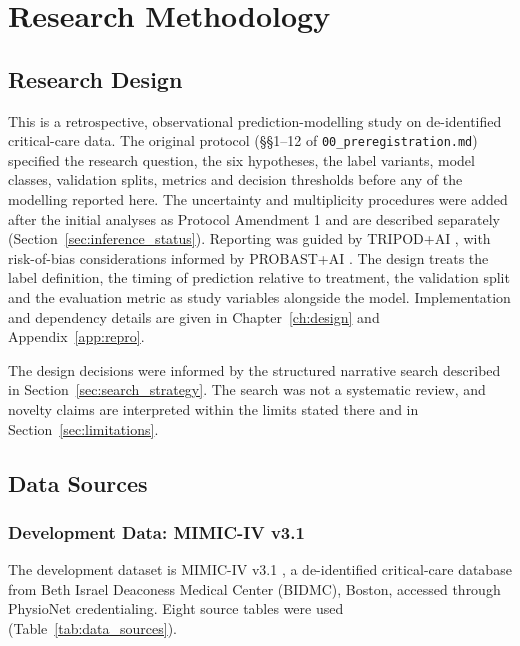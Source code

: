 \chapter{Research Methodology}
\label{ch:methodology}


\section{Research Design}

This is a retrospective, observational prediction-modelling study on
de-identified critical-care data. The original protocol (\S\S1--12 of
\texttt{00\_preregistration.md}) specified the research question, the six
hypotheses, the label variants, model classes, validation splits, metrics and
decision thresholds before any of the modelling reported here. The uncertainty
and multiplicity procedures were added after the initial analyses as Protocol
Amendment 1 and are described separately (Section~\ref{sec:inference_status}).
Reporting was guided by TRIPOD+AI \cite{collins2024tripodai}, with
risk-of-bias considerations informed by PROBAST+AI \cite{moons2025probastai}.
The design treats the label definition, the timing
of prediction relative to treatment, the validation split and the evaluation
metric as study variables alongside the model. Implementation and dependency
details are given in Chapter~\ref{ch:design} and Appendix~\ref{app:repro}.

The design decisions were informed by the structured narrative search
described in Section~\ref{sec:search_strategy}. The search was not a
systematic review, and novelty claims are interpreted within the limits stated
there and in Section~\ref{sec:limitations}.


\section{Data Sources}
\label{sec:data}

\subsection{Development Data: MIMIC-IV v3.1}

The development dataset is MIMIC-IV v3.1
\cite{johnson2023mimiciv,johnson2023mimiciv_scidata,pollard2026physionet}, a
de-identified critical-care database from Beth Israel Deaconess Medical Center
(BIDMC), Boston, accessed through PhysioNet credentialing. Eight source tables
were used (Table~\ref{tab:data_sources}).

